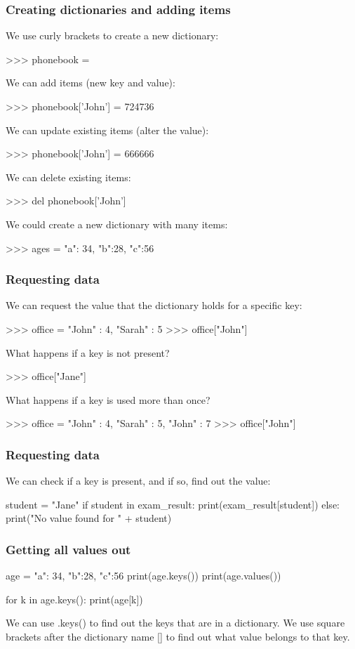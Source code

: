 \documentclass{beamer}
\begin{document}
\begin{frame}[fragile]
\frametitle{Creating dictionaries and adding items}
We use curly brackets to create a new dictionary:
\begin{code}
>>> phonebook = {}
\end{code}

We can add items (new key and value):
\begin{code}
>>> phonebook['John'] = 724736
\end{code}

We can update existing items (alter the value):
\begin{code}
>>> phonebook['John'] = 666666
\end{code}

We can delete existing items:
\begin{code}
>>> del phonebook['John']
\end{code}

We could create a new dictionary with many items:
\begin{code}
>>> ages = { "a": 34, "b":28, "c":56 }
\end{code}
\end{frame}

\begin{frame}[fragile]
\frametitle{Requesting data}
We can request the value that the dictionary holds for a specific
key:
\begin{code}
>>> office = { "John" : 4, "Sarah" : 5 }
>>> office["John"]
\end{code}
 What happens if a key is not present?
\begin{code}
>>> office["Jane"]
\end{code}
 What happens if a key is used more than once?
\begin{code}
>>> office = { "John" : 4, "Sarah" : 5, "John" : 7 }
>>> office["John"]
\end{code}
\end{frame}


\begin{frame}[fragile]
\frametitle{Requesting data}
We can check if a key is present, and if so, find out the
value:
\begin{code}
student = "Jane"
if student in exam_result:
   print(exam_result[student])
else:
   print("No value found for " + student)
\end{code}
\end{frame}

\begin{frame}[fragile]
\frametitle{Getting all values out}
\begin{code}
age = { "a": 34, "b":28, "c":56 }
print(age.keys())
print(age.values())

for k in age.keys():
   print(age[k])
\end{code}
We can use .keys() to find out the keys that are in a dictionary.
We use square brackets after the dictionary name [] to find
out what value belongs to that key.
\end{frame}
\end{document}
